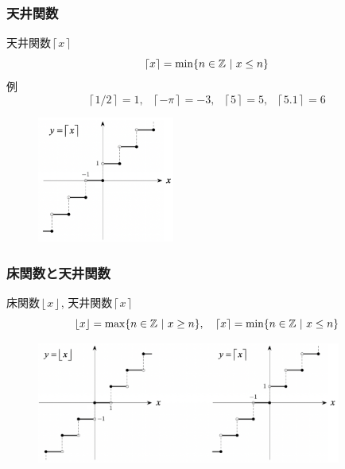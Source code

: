 \begin{frame}
\frametitle{天井関数}   


天井関数$\left \lceil{x}\right \rceil$
$$
\left \lceil{x}\right \rceil = \min\{ n \in \mathbb{Z} \ | \ x \le n\}
$$
例
$$
\left \lceil{1/2}\right \rceil =1, \ \ \  \left \lceil{-\pi}\right \rceil =-3, \ \ \ \left \lceil{5}\right \rceil =5,  \ \ \ \left \lceil{5.1}\right \rceil =6
$$

\vspace{-1mm}

\begin{figure}[htbp]
 \begin{center} 
  \includegraphics[width=45mm]{calculus2/ceiling.png}
 \end{center}
\end{figure}
\vspace{-4mm}

\end{frame}






\begin{frame}
\frametitle{床関数と天井関数}   


床関数$\left \lfloor{x}\right \rfloor $, 天井関数$\left \lceil{x}\right \rceil$
$$
\left \lfloor{x}\right \rfloor = \max\{ n \in \mathbb{Z} \ | \ x \ge n\}, \ \ \ \left \lceil{x}\right \rceil = \min\{ n \in \mathbb{Z} \ | \ x \le n\}
$$

\vspace{-1mm}

\begin{figure}[htbp]
 \begin{center} 
  \includegraphics[width=100mm]{calculus2/floor_ceiling.png}
 \end{center}
\end{figure}
\vspace{-4mm}

\end{frame}



